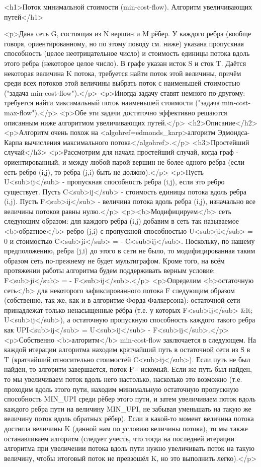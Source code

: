 <h1>Поток минимальной стоимости (min-cost-flow). Алгоритм увеличивающих путей</h1>

<p>Дана сеть G, состоящая из N вершин и M рёбер. У каждого ребра (вообще говоря, ориентированному, но по этому поводу см. ниже) указана пропускная способность (целое неотрицательное число) и стоимость единицы потока вдоль этого ребра (некоторое целое число). В графе указан исток S и сток T. Даётся некоторая величина K потока, требуется найти поток этой величины, причём среди всех потоков этой величины выбрать поток с наименьшей стоимостью ("задача min-cost-flow").</p>
<p>Иногда задачу ставят немного по-другому: требуется найти максимальный поток наименьшей стоимости ("задача min-cost-max-flow").</p>
<p>Обе эти задачи достаточно эффективно решаются описанным ниже алгоритмом увеличивающих путей.</p>
<h2>Описание</h2>
<p>Алгоритм очень похож на <algohref=edmonds_karp>алгоритм Эдмондса-Карпа вычисления максимального потока</algohref>.</p>
<h3>Простейший случай</h3>
<p>Рассмотрим для начала простейший случай, когда граф - ориентированный, и между любой парой вершин не более одного ребра (если есть ребро (i,j), то ребра (j,i) быть не должно).</p>
<p>Пусть U<sub>ij</sub> - пропускная способность ребра (i,j), если это ребро существует. Пусть C<sub>ij</sub> - стоимость единицы потока вдоль ребра (i,j). Пусть F<sub>ij</sub> - величина потока вдоль ребра (i,j), изначально все величины потоков равны нулю.</p>
<p><b>Модифицируем</b> сеть следующим образом: для каждого ребра (i,j) добавим в сеть так называемое <b>обратное</b> ребро (j,i) с пропускной способностью U<sub>ji</sub> = 0 и стоимостью C<sub>ji</sub> = - C<sub>ij</sub>. Поскольку, по нашему предположению, ребра (j,i) до этого в сети не было, то модифицированная таким образом сеть по-прежнему не будет мультиграфом. Кроме того, на всём протяжении работы алгоритма будем поддерживать верным условие: F<sub>ji</sub> = - F<sub>ij</sub>.</p>
<p>Определим <b>остаточную сеть</b> для некоторого зафиксированного потока F следующим образом (собственно, так же, как и в алгоритме Форда-Фалкерсона): остаточной сети принадлежат только ненасыщенные рёбра (т.е. у которых F<sub>ij</sub> &lt; U<sub>ij</sub>), а остаточную пропускную способность каждого такого ребра как UPI<sub>ij</sub> = U<sub>ij</sub> - F<sub>ij</sub>.</p>
<p>Собственно <b>алгоритм</b> min-cost-flow заключается в следующем. На каждой итерации алгоритма находим кратчайший путь в остаточной сети из S в T (кратчайший относительно стоимостей C<sub>ij</sub>). Если путь не был найден, то алгоритм завершается, поток F - искомый. Если же путь был найден, то мы увеличиваем поток вдоль него настолько, насколько это возможно (т.е. проходим вдоль этого пути, находим минимальную остаточную пропускную способность MIN_UPI среди рёбер этого пути, и затем увеличиваем поток вдоль каждого ребра пути на величину MIN_UPI, не забывая уменьшать на такую же величину поток вдоль обратных рёбер). Если в какой-то момент величина потока достигла величины K (данной нам по условию величины потока), то мы также останавливаем алгоритм (следует учесть, что тогда на последней итерации алгоритма при увеличении потока вдоль пути нужно увеличивать поток на такую величину, чтобы итоговый поток не превзошёл K, но это выполнить легко).</p>
